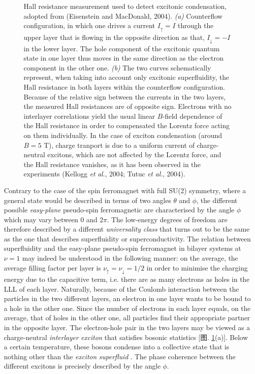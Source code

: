 \documentclass[10pt]{book}
\newcommand{\ua}{\uparrow}
\newcommand{\da}{\downarrow}
\begin{document}
\begin{figure}
\begin{center}
\end{center}
\caption{ Hall resistance measurement used to detect excitonic condensation, adopted from (Eisenstein and MacDonald, 2004).
{\sl (a)} Counterflow configuration, in which one drives a current $I_{\ua}=I$ through the upper layer that is
flowing in the opposite direction as that, $I_{\da}=-I$ in the lower layer. The hole component of the excitonic quantum
state in one layer thus moves in the same direction as the electron component in the other one.
{\sl (b)} The two curves schematically represent, when taking into account only excitonic superfluidity, 
the Hall resistance in both layers within the counterflow configuration. Because of the relative sign between 
the currents in the two layers, the measured Hall resistances are of opposite sign. Electrons with no interlayer correlations
yield the usual linear $B$-field dependence of the Hall resistance in order to compensated the Lorentz force
acting on them individually. In the case of exciton condensation (around
$B=5$ T), charge tranport is due to a uniform current of charge-neutral excitons, which are not affected by the Lorentz force,
and the Hall resistance vanishes, as it has been observed in the experiments (Kellogg {\sl et al.}, 2004; Tutuc {\sl et al.}, 2004).}
\label{fig25}
\end{figure}


Contrary to the case of the spin ferromagnet with full SU(2) symmetry, where a general state would be described in terms
of two angles $\theta$ and $\phi$, the different possible {\sl easy-plane} pseudo-spin ferromagnetic are characterised 
by the angle $\phi$ which may vary between $0$ and $2\pi$. The low-energy degrees of freedom are therefore described by
a different {\sl universality class} that turns out to be the same as the one that describes superfluidity or
superconductivity. The relation between superfluidity and the easy-plane pseudo-spin ferromagnet in bilayer systems at
$\nu=1$ may indeed be understood in the following manner: on the average, the average filling factor per layer 
is $\nu_{\ua}=\nu_{\da}=1/2$ in order to minimise the charging energy due to the capacitive term, i.e. there are as many
electrons as holes in the LLL of each layer. Naturally, because of the Coulomb interaction between the particles in the
two different layers, an electron in one layer wants to be bound to a hole in the other one. Since the number of
electrons in each layer equals, on the average, that of holes in the other one, all particles find their appropriate 
partner in the opposite layer. The electron-hole pair in the two layers may be viewed as a charge-neutral {\sl interlayer exciton} that
satisfies bosonic statistics [图. \ref{fig25}(a)]. Below a certain temperature, these bosons condense into a collective state that is
nothing other than the {\sl exciton superfluid} \cite{fertig,WZ,EI,moon}. 
The phase coherence between the different excitons is precisely described by the angle $\phi$.
\end{document}
